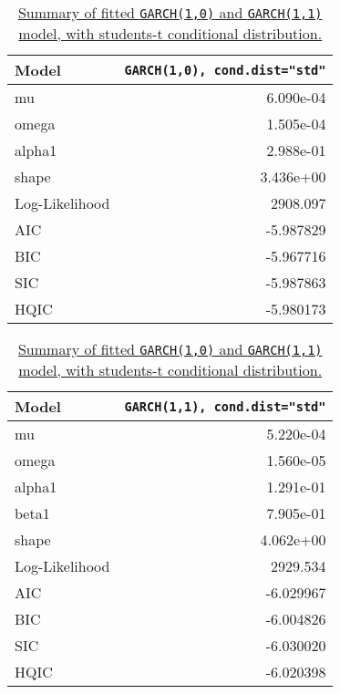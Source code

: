 \documentclass{article}
\newcommand{\1}{\mathbbm{1}}
\theoremstyle{definition}
\begin{document}
\begin{table}[H]
\centering
\begin{minipage}[t]{0.48\textwidth} %
\centering
\scriptsize %
\begin{tabular}{l|r}
\hline
\textbf{Model}  & \texttt{GARCH(1,0), cond.dist="std"} \\
\hline
mu & 6.090e-04\\
omega & 1.505e-04\\
alpha1 & 2.988e-01\\
shape & 3.436e+00\\
\hline
Log-Likelihood  & 2908.097 \\
AIC             & -5.987829 \\
BIC             & -5.967716 \\
SIC             & -5.987863\\
HQIC            & -5.980173\\
\hline
\end{tabular}
\end{minipage}
\hfill
\begin{minipage}[t]{0.48\textwidth} %
\centering
\scriptsize %
\begin{tabular}{l|r}
\hline
\textbf{Model}  & \texttt{GARCH(1,1), cond.dist="std"} \\
\hline
mu              & 5.220e-04\\
omega           & 1.560e-05\\
alpha1          & 1.291e-01\\
beta1           & 7.905e-01\\
shape           & 4.062e+00\\
\hline
Log-Likelihood  & 2929.534 \\
AIC             & -6.029967 \\
BIC             & -6.004826 \\
SIC             & -6.030020\\
HQIC            & -6.020398\\
\hline
\end{tabular}
\end{minipage}
\caption{\small{\hyperref[subsec:arch_garch_model_summary]{Summary of fitted \texttt{GARCH(1,0)} and \texttt{GARCH(1,1)} model, with students-t conditional distribution.}}}
\label{tab:arch_garch_model_summary}
\end{table}
\end{document}
